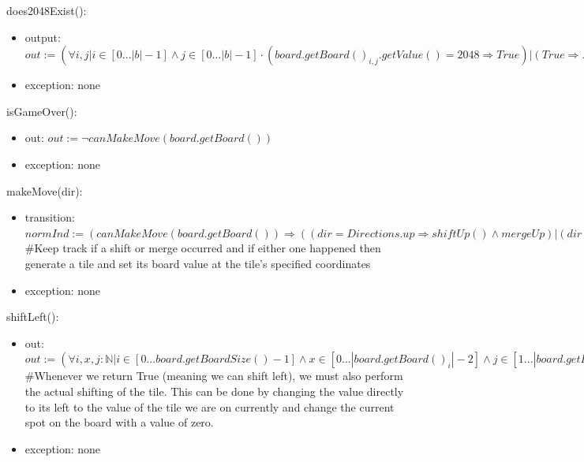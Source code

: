 \documentclass[12pt]{article}
\begin{document}
\noindent does2048Exist():
\begin{itemize}
\item output: $out := (\forall i,j \vert i \in [0...|b| - 1] \land j \in [0...|b| - 1] \cdot (board.getBoard()_{i,j}.getValue() = 2048 \Rightarrow True) \vert (True \Rightarrow False))$
\item exception: none
\end{itemize}

\noindent isGameOver():
\begin{itemize}
\item out: $out := \lnot canMakeMove(board.getBoard())$
\item exception: none
\end{itemize}

\noindent makeMove(dir):
\begin{itemize}
\item transition: $\mathit{normInd} := (canMakeMove(board.getBoard()) \Rightarrow ((dir = Directions.up \Rightarrow shiftUp() \land mergeUp) \vert (dir = Directions.down \Rightarrow shiftDown() \land mergeDown) \vert (dir = Directions.right \Rightarrow shiftRight() \land mergeRight) \vert (dir = Directions.left \Rightarrow shiftLeft() \land mergeLeft) \vert (True \Rightarrow True)))$\\
\#Keep track if a shift or merge occurred and if either one happened then generate a tile and set its board value at the tile's specified coordinates
\item exception: none
\end{itemize}

\noindent shiftLeft():
\begin{itemize}
\item out: $out := (\forall i,x,j : \mathbb{N} \vert i \in [0...board.getBoardSize() - 1] \land x \in [0...|board.getBoard()_i| - 2] \land j \in [1...|board.getBoard()_i| - 1] \vert (board.getBoardValueAt(i, j - 1) = 0 \land \lnot (board.getBoardValueAt(i, j) = 0) \Rightarrow True) \vert (True \Rightarrow False)))$\\
\#Whenever we return True (meaning we can shift left), we must also perform the actual shifting of the tile. This can be done by changing the  value directly to its left to the value of the tile we are on currently and change the current spot on the board with a value of zero.
\item exception: none
\end{itemize}
\end{document}
